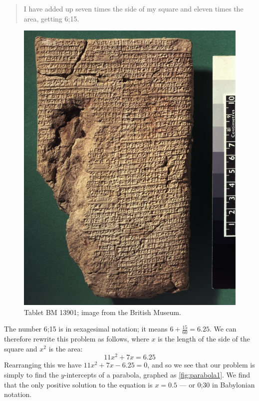 \documentclass[a4paper,10pt,titlepage]{article}
\theoremstyle{definition}
\begin{document}
\begin{quote}
  I have added up seven times the side of my square and eleven times the area,
  getting 6;15.
\end{quote}

\begin{figure}\label{fig:babylon2}
  \centering
  \includegraphics[width=\textwidth]{babylon2}
  \caption[blag]{Tablet BM 13901; image from the British Museum.}
\end{figure}

The number 6;15 is in sexagesimal notation; it means $ 6 + \frac{15}{60} = 6.25 $. We
can therefore rewrite this problem as follows, where $ x $ is the length of the side
of the square and $ x^2 $ is the area:
\begin{displaymath}
  11x^2 + 7x = 6.25
\end{displaymath}
Rearranging this we have $ 11x^2 + 7x - 6.25 = 0 $, and so we see that our problem is simply
to find the $ y$-intercepts of a parabola, graphed as \cref{fig:parabola1}. We find that the
only positive solution to the equation is $ x = 0.5 $ --- or 0;30 in Babylonian notation.
\end{document}
